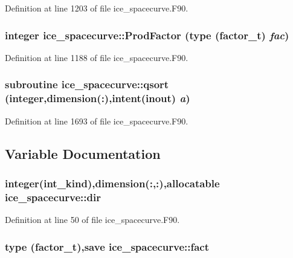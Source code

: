 Definition at line 1203 of file ice\_\-spacecurve.F90.\hypertarget{namespaceice__spacecurve_a57f86858b3f4450ed95750ff8405f12f}{
\subsubsection[{ProdFactor}]{\setlength{\rightskip}{0pt plus 5cm}integer ice\_\-spacecurve::ProdFactor (type (factor\_\-t) {\em fac})}}
\label{namespaceice__spacecurve_a57f86858b3f4450ed95750ff8405f12f}


Definition at line 1188 of file ice\_\-spacecurve.F90.\hypertarget{namespaceice__spacecurve_aa67766fe40142781287d478cff83322e}{
\subsubsection[{qsort}]{\setlength{\rightskip}{0pt plus 5cm}subroutine ice\_\-spacecurve::qsort (integer,dimension(:),intent(inout) {\em a})}}
\label{namespaceice__spacecurve_aa67766fe40142781287d478cff83322e}


Definition at line 1693 of file ice\_\-spacecurve.F90.

\subsection{Variable Documentation}
\hypertarget{namespaceice__spacecurve_a39f2092f453a0a651c4efda8291bc0cf}{
\subsubsection[{dir}]{\setlength{\rightskip}{0pt plus 5cm}integer(int\_\-kind),dimension(:,:),allocatable {\bf ice\_\-spacecurve::dir}}}
\label{namespaceice__spacecurve_a39f2092f453a0a651c4efda8291bc0cf}


Definition at line 50 of file ice\_\-spacecurve.F90.\hypertarget{namespaceice__spacecurve_aa520de333aa94f300555f836420d5b30}{
\subsubsection[{fact}]{\setlength{\rightskip}{0pt plus 5cm}type ({\bf factor\_\-t}),save {\bf ice\_\-spacecurve::fact}}}
\label{namespaceice__spacecurve_aa520de333aa94f300555f836420d5b30}


